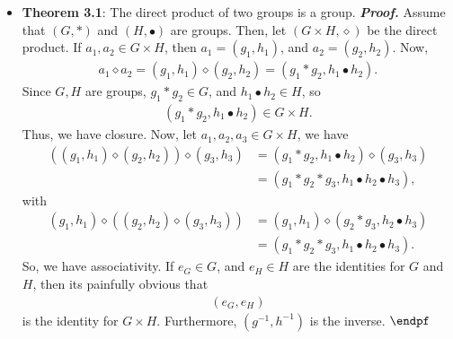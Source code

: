 \documentclass{report}
\begin{document}
\begin{itemize}
            \begin{align*}
                (g_{1}, h_{1}) \diamond (g_{2}, h_{2}) = (g_{1} \ast g_{2}, h_{1} \bullet h_{2})
            \end{align*}
            for all $g_{i} \in G$, $h_{i} \in H$. Under this operation, we call $G\times H$ the \textbf{direct product} of $G$ and $H$.
            \bigbreak \noindent 
            \textbf{Note:} So, the underlying set is the Cartesian product, with operation $\diamond$. Thus, the group is
            \begin{align*}
                (G\times H, \diamond)
            .\end{align*}
        \item \textbf{Theorem 3.1}: The direct product of two groups is a group.
            \bigbreak \noindent 
            \textbf{\textit{Proof.}} Assume that $(G, \ast)$ and $(H, \bullet)$ are groups. Then, let $(G\times H, \diamond)$ be the direct product. 
            \bigbreak \noindent 
            If $a_{1}, a_{2} \in G\times H$, then $a_{1} = (g_{1}, h_{1})$, and $a_{2} = (g_{2}, h_{2})$. Now, 
            \begin{align*}
                a_{1} \diamond a_{2} = (g_{1}, h_{1}) \diamond (g_{2}, h_{2}) = (g_{1} \ast g_{2}, h_{1} \bullet h_{2})
            .\end{align*}
            Since $G,H$ are groups, $g_{1} \ast g_{2} \in G$, and $h_{1} \bullet h_{2} \in H$, so
            \begin{align*}
                (g_{1} \ast g_{2}, h_{1} \bullet h_{2}) \in G \times H
            .\end{align*}
            Thus, we have closure. Now, let $a_{1}, a_{2}, a_{3} \in G\times H $, we have
            \begin{align*}
                ((g_{1}, h_{1}) \diamond (g_{2}, h_{2})) \diamond (g_{3}, h_{3}) &= (g_{1} \ast g_{2}, h_{1} \bullet h_{2}) \diamond (g_{3}, h_{3}) \\
                                                                                 &= (g_{1} \ast g_{2} \ast g_{3}, h_{1} \bullet h_{2} \bullet h_{3})
            ,\end{align*}
            with
            \begin{align*}
                (g_{1}, h_{1}) \diamond ((g_{2}, h_{2}) \diamond (g_{3}, h_{3})) &= (g_{1}, h_{1}) \diamond (g_{2} \ast g_{3}, h_{2} \bullet h_{3}) \\
                                                                                 &= (g_{1} \ast g_{2} \ast g_{3}, h_{1} \bullet h_{2} \bullet h_{3})
            .\end{align*}
            So, we have associativity. If $e_{G} \in G$, and $e_{H} \in H$ are the identities for $G$ and $H$, then its painfully obvious that
            \begin{align*}
                (e_{G}, e_{H})
            \end{align*}
            is the identity for $G \times H$. Furthermore, $(g^{-1}, h^{-1})$ is the inverse. $\endpf$

    \end{itemize}
\end{document}
